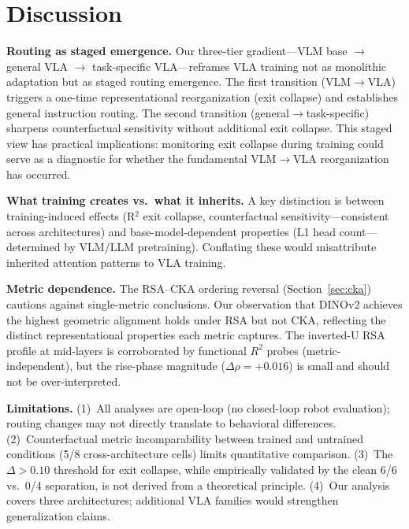 \documentclass[10pt,twocolumn]{article}
\begin{document}
\section{Discussion}
\label{sec:discussion}

\textbf{Routing as staged emergence.}
Our three-tier gradient---VLM base $\to$ general VLA $\to$ task-specific VLA---reframes VLA training not as monolithic adaptation but as staged routing emergence.
The first transition (VLM$\to$VLA) triggers a one-time representational reorganization (exit collapse) and establishes general instruction routing.
The second transition (general$\to$task-specific) sharpens counterfactual sensitivity without additional exit collapse.
This staged view has practical implications: monitoring exit collapse during training could serve as a diagnostic for whether the fundamental VLM$\to$VLA reorganization has occurred.

\textbf{What training creates vs.\ what it inherits.}
A key distinction is between training-induced effects (R$^2$ exit collapse, counterfactual sensitivity---consistent across architectures) and base-model-dependent properties (L1 head count---determined by VLM/LLM pretraining).
Conflating these would misattribute inherited attention patterns to VLA training.

\textbf{Metric dependence.}
The RSA--CKA ordering reversal (Section~\ref{sec:cka}) cautions against single-metric conclusions.
Our observation that DINOv2 achieves the highest geometric alignment holds under RSA but not CKA, reflecting the distinct representational properties each metric captures.
The inverted-U RSA profile at mid-layers is corroborated by functional $R^2$ probes (metric-independent), but the rise-phase magnitude ($\Delta\rho = +0.016$) is small and should not be over-interpreted.

\textbf{Limitations.}
(1)~All analyses are open-loop (no closed-loop robot evaluation); routing changes may not directly translate to behavioral differences.
(2)~Counterfactual metric incomparability between trained and untrained conditions (5/8 cross-architecture cells) limits quantitative comparison.
(3)~The $\Delta > 0.10$ threshold for exit collapse, while empirically validated by the clean 6/6 vs.\ 0/4 separation, is not derived from a theoretical principle.
(4)~Our analysis covers three architectures; additional VLA families would strengthen generalization claims.


\end{document}
